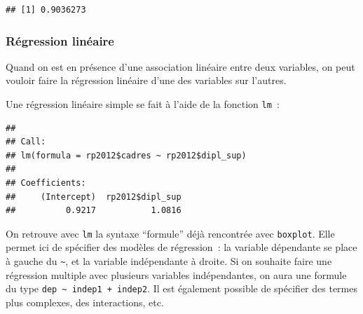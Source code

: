 \documentclass[12pt,]{book}
\makeatletter
\newenvironment{Shaded}{\begin{snugshade}}{\end{snugshade}}
\newcommand{\DataTypeTok}[1]{\textcolor[rgb]{0.27,0.27,0.27}{#1}}
\newcommand{\KeywordTok}[1]{\textcolor[rgb]{0.27,0.27,0.27}{\textbf{#1}}}
\newcommand{\NormalTok}[1]{#1}
\newcommand{\OperatorTok}[1]{\textcolor[rgb]{0.43,0.43,0.43}{\textbf{#1}}}
\newcommand{\StringTok}[1]{\textcolor[rgb]{0.5,0.5,0.5}{#1}}
\newenvironment{kframe}{%
\medskip{}
\setlength{\fboxsep}{.8em}
 \def\at@end@of@kframe{}%
 \ifinner\ifhmode%
  \def\at@end@of@kframe{\end{minipage}}%
  \begin{minipage}{\columnwidth}%
 \fi\fi%
 \def\FrameCommand##1{\hskip\@totalleftmargin \hskip-\fboxsep
 \colorbox{shadecolor}{##1}\hskip-\fboxsep
     \hskip-\linewidth \hskip-\@totalleftmargin \hskip\columnwidth}%
 \MakeFramed {\advance\hsize-\width
   \@totalleftmargin\z@ \linewidth\hsize
   \@setminipage}}%
 {\par\unskip\endMakeFramed%
 \at@end@of@kframe}
\newenvironment{rmdblock}[1]
  {
  \begin{itemize}
  \renewcommand{\labelitemi}{
    \raisebox{-.7\height}[0pt][0pt]{
      {\setkeys{Gin}{width=3em,keepaspectratio}\texttt{[image: images/\#1]}}
    }
  }
  \setlength{\fboxsep}{1em}
  \begin{kframe}
  \item
  }
  {
  \end{kframe}
  \end{itemize}
  }
\newenvironment{rmdnote}
  {\begin{rmdblock}{note}}
  {\end{rmdblock}}
\makeatother
\begin{document}
\begin{Shaded}
\end{Shaded}

\begin{verbatim}
## [1] 0.9036273
\end{verbatim}

\hypertarget{ruxe9gression-linuxe9aire}{%
\subsubsection{Régression linéaire}\label{ruxe9gression-linuxe9aire}}

Quand on est en présence d'une association linéaire entre deux variables, on peut vouloir faire la régression linéaire d'une des variables sur l'autres.

Une régression linéaire simple se fait à l'aide de la fonction \texttt{lm}~:

\begin{Shaded}
\end{Shaded}

\begin{verbatim}
## 
## Call:
## lm(formula = rp2012$cadres ~ rp2012$dipl_sup)
## 
## Coefficients:
##     (Intercept)  rp2012$dipl_sup  
##          0.9217           1.0816
\end{verbatim}

\begin{rmdnote}
On retrouve avec \texttt{lm} la syntaxe ``formule'' déjà rencontrée avec
\texttt{boxplot}. Elle permet ici de spécifier des modèles de
régression~: la variable dépendante se place à gauche du
\texttt{\textasciitilde{}}, et la variable indépendante à droite. Si on
souhaite faire une régression multiple avec plusieurs variables
indépendantes, on aura une formule du type
\texttt{dep\ \textasciitilde{}\ indep1\ +\ indep2}. Il est également
possible de spécifier des termes plus complexes, des interactions, etc.
\end{rmdnote}
\end{document}

